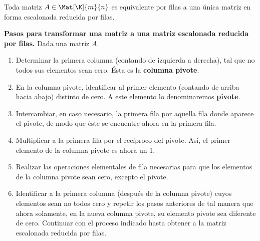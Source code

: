\documentclass[compacto,10pt]{pubciencias-notas}
\begin{document}
\begin{teo}
    Toda matriz $A\in\Mat[\K]{m}{n}$ es equivalente por filas a una única matriz en forma escalonada reducida por filas. 
\end{teo}

\textbf{Pasos para transformar una matriz a una matriz escalonada reducida por filas.} Dada una matriz $A$.
\begin{enumerate}
\item Determinar la primera columna (contando de izquierda a derecha), tal que no todos sus elementos sean cero. Ésta es la \textbf{columna pivote}.
\item En la columna pivote, identificar al primer elemento (contando de arriba hacia abajo) distinto de cero. A este elemento lo denominaremos \textbf{pivote}.
\item Intercambiar, en caso necesario, la primera fila por aquella fila donde aparece el pivote, de modo que éste se encuentre ahora en la primera fila.
\item Multiplicar a la primera fila por el recíproco del pivote. Así, el primer elemento de la columna pivote es ahora un 1.
\item Realizar las operaciones elementales de fila necesarias para que los elementos de la columna pivote sean cero, excepto el pivote.
\item Identificar a la primera columna (después de la columna pivote) cuyos elementos sean no todos cero y repetir los pasos anteriores de tal manera que ahora solamente, en la nueva columna pivote, su elemento pivote sea diferente de cero. Continuar con el proceso indicado hasta obtener a la matriz escalonada reducida por filas.
\end{enumerate}


\end{document}
